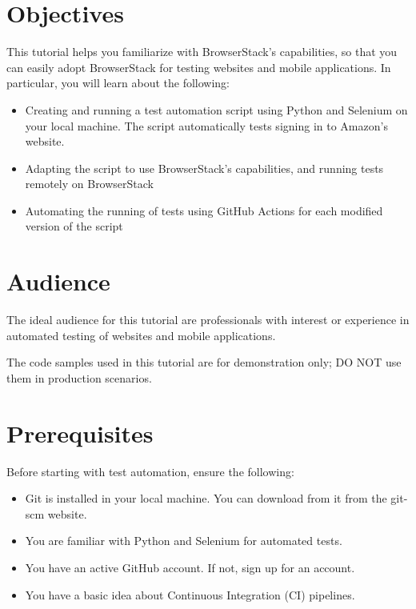 \documentclass{article}
\begin{document}
\section*{Objectives}

This tutorial helps you familiarize with BrowserStack's capabilities, so that you can easily adopt BrowserStack for testing websites and mobile applications. In particular, you will learn about the following:

\begin{itemize}
    \item Creating and running a test automation script using Python and Selenium on your local machine. The script automatically tests signing in to Amazon's website.
    \item Adapting the script to use BrowserStack's capabilities, and running tests remotely on BrowserStack
    \item Automating the running of tests using GitHub Actions for each modified version of the script
\end{itemize}

\section*{Audience}

The ideal audience for this tutorial are professionals with interest or experience in automated testing of websites and mobile applications.

\begin{tcolorbox}[colback=yellow!5!white,colframe=orange!75!black,title=Warning]
The code samples used in this tutorial are for demonstration only; DO NOT use them in production scenarios.
\end{tcolorbox}

\section*{Prerequisites}

Before starting with test automation, ensure the following:

\begin{itemize}
    \item Git is installed in your local machine. You can download from it from the git-scm website.
    \item You are familiar with Python and Selenium for automated tests.
    \item You have an active GitHub account. If not, sign up for an account.
    \item You have a basic idea about Continuous Integration (CI) pipelines.
\end{itemize}
\end{document}
